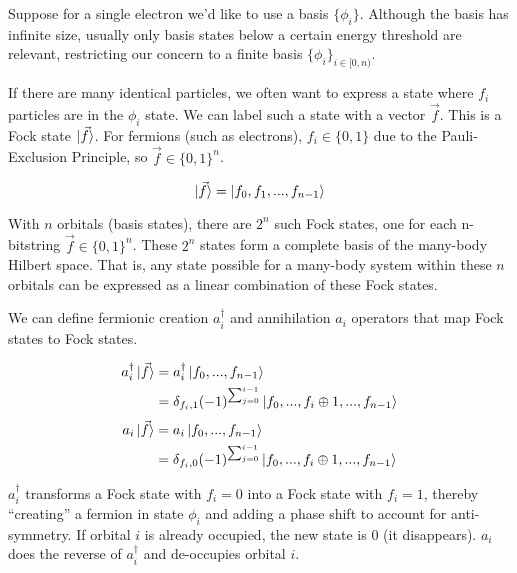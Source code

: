 Suppose for a single electron we'd like to use a basis $\{\phi_i\}$. Although the basis has infinite size, usually only basis states below a certain energy threshold are relevant, restricting our concern to a finite basis $\{\phi_i\}_{i \in [0, n)}$.

If there are many identical particles, we often want to express a state where $f_i$ particles are in the $\phi_i$ state. We can label such a state with a vector $\vec{f}$. This is a Fock state $\ket{\vec{f}}$. For fermions (such as electrons), $f_i \in \{0, 1\}$ due to the Pauli-Exclusion Principle, so $\vec{f} \in \{0, 1\}^n$.

\begin{equation}
    \ket{\vec{f}} = \ket{f_0, f_1, ..., f_{n - 1}} \label{eq: fock}
\end{equation}

With $n$ orbitals (basis states), there are $2^n$ such Fock states, one for each n-bitstring $\vec{f} \in \{0, 1\}^n$. These $2^n$ states form a complete basis of the many-body Hilbert space. That is, any state possible for a many-body system within these $n$ orbitals can be expressed as a linear combination of these Fock states.

We can define fermionic creation $a^\dag_i$ and annihilation $a_i$ operators that map Fock states to Fock states.

\begin{equation}
    \begin{split}
        a^\dag_i\ket{\vec{f}} &= a^\dag_i\ket{f_0, ..., f_{n - 1}} \\
        &= \delta_{f_i, 1}(-1)^{\sum_{j = 0}^{i - 1}}\ket{f_0, ..., f_i \oplus 1, ..., f_{n - 1}}
    \end{split}
    \label{eq: creation}
\end{equation}
\begin{equation}
    \begin{split}
        a_i\ket{\vec{f}} &= a_i\ket{f_0, ..., f_{n - 1}} \\
        &= \delta_{f_i, 0}(-1)^{\sum_{j = 0}^{i - 1}}\ket{f_0, ..., f_i \oplus 1, ..., f_{n - 1}}
    \end{split}
    \label{eq: annihilation}
\end{equation}

$a^\dag_i$ transforms a Fock state with $f_i = 0$ into a Fock state with $f_i = 1$, thereby ``creating'' a fermion in state $\phi_i$ and adding a phase shift to account for anti-symmetry. If orbital $i$ is already occupied, the new state is $0$ (it disappears). $a_i$ does the reverse of $a^\dag_i$ and de-occupies orbital $i$.

